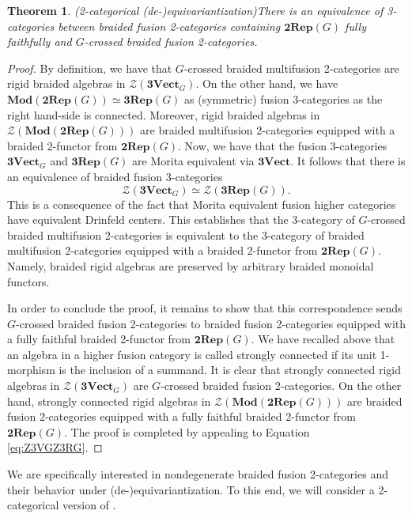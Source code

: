 \documentclass[11pt,reqno]{amsart}
\numberwithin{equation}{section}
\theoremstyle{plain}
\newtheorem{thm}[equation]{Theorem}
\theoremstyle{definition}
\begin{document}
\begin{thm}{(2-categorical (de-)equivariantization)}\label{thm:deequiv}
There is an equivalence of 3-categories between braided fusion 2-categories containing $\mathbf{2Rep}(G)$ fully faithfully and $G$-crossed braided fusion 2-categories.
\end{thm}
\begin{proof}
By definition, we have that $G$-crossed braided multifusion 2-categories are rigid braided algebras in $\mathcal{Z}(\mathbf{3Vect}_G)$. On the other hand, we have $\mathbf{Mod}(\mathbf{2Rep}(G))\simeq \mathbf{3Rep}(G)$ as (symmetric) fusion 3-categories as the right hand-side is connected. Moreover, rigid braided algebras in $\mathcal{Z}(\mathbf{Mod}(\mathbf{2Rep}(G)))$ are braided multifusion 2-categories equipped with a braided 2-functor from $\mathbf{2Rep}(G)$. Now, we have that the fusion 3-categories $\mathbf{3Vect}_G$ and $\mathbf{3Rep}(G)$ are Morita equivalent via $\mathbf{3Vect}$. It follows that there is an equivalence of braided fusion 3-categories
\begin{equation}\label{eq:Z3VGZ3RG}
\mathcal{Z}(\mathbf{3Vect}_G)\simeq\mathcal{Z}(\mathbf{3Rep}(G)).
\end{equation}
This is a consequence of the fact that Morita equivalent fusion higher categories have equivalent Drinfeld centers.
This establishes that the 3-category of $G$-crossed braided multifusion 2-categories is equivalent to the 3-category of braided multifusion 2-categories equipped with a braided 2-functor from $\mathbf{2Rep}(G)$.
Namely, braided rigid algebras are preserved by arbitrary braided monoidal functors.

In order to conclude the proof, it remains to show that this correspondence sends $G$-crossed braided fusion 2-categories to braided fusion 2-categories equipped with a fully faithful braided 2-functor from $\mathbf{2Rep}(G)$. We have recalled above that an algebra in a higher fusion category is called strongly connected if its unit 1-morphism is the inclusion of a summand. It is clear that strongly connected rigid algebras in $\mathcal{Z}(\mathbf{3Vect}_G)$ are $G$-crossed braided fusion 2-categories. On the other hand, strongly connected rigid algebras in $\mathcal{Z}(\mathbf{Mod}(\mathbf{2Rep}(G)))$ are braided fusion 2-categories equipped with a fully faithful braided 2-functor from $\mathbf{2Rep}(G)$. The proof is completed by appealing to Equation \eqref{eq:Z3VGZ3RG}.
\end{proof}

We are specifically interested in nondegenerate braided fusion 2-categories and their behavior under (de-)equivariantization. To this end, we will consider a 2-categorical version of \cite[Proposition 4.56]{DGNO}.
\end{document}
